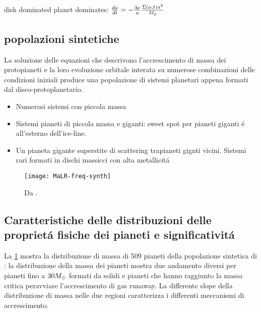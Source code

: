 \begin{workout}
disk dominated
planet dominates: $\TDy{t}{a}=-\frac{3\nu}{a}\frac{\Sigma(a,t)a^2}{M_p}$
\end{workout}

\begin{workout}

\section{popolazioni sintetiche}
La soluzione delle equazioni che descrivono l'accrescimento di massa dei protopianeti e la loro evoluzione orbitale interata su numerose combinazioni delle condizioni iniziali produce una popolazione di sistemi planetari appena formati dal disco-protoplanetario.

\begin{itemize}
\item Numerosi sistemi con piccola massa
\item Sistemi pianeti di piccola massa e giganti: sweet spot per pianeti giganti \'e all'esterno dell'ice-line.
\item Un pianeta gigante superstite di scattering trapianeti gignti vicini. Sistemi rari formati in dischi massicci con alta metallicit\'a
\end{itemize}

\end{workout}

\begin{figure}[!ht]
\texttt{[image: MaLR-freq-synth]}\label{fig:MaLR-freq-synth}
\caption{Da \cite{mordasini2018planetary}. }
\end{figure}

\subsection{Caratteristiche delle distribuzioni delle propriet\'a fisiche dei pianeti e significativit\'a}

La \ref{fig:MaLR-freq-synth} mostra la distribuzione di massa di 509 pianeti della popolazione sintetica di \cite{mordasini2018planetary}: la distribuzione della massa dei pianeti mostra due andamento diversi per pianeti fino a $30\mearth{}$ formati da solidi e pianeti che hanno raggiunto la massa critica peravviare l'accrescimento di gas runaway. La differente slope della distribuzione di massa nelle due regioni caratterizza i differenti meccanismi di accrescimento. 

